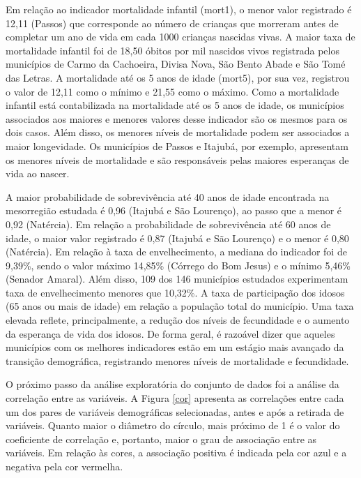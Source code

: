 \documentclass[10pt,twoside]{article}
\begin{document}
Em relação ao indicador mortalidade infantil (mort1), o menor valor registrado é 12,11 (Passos) que corresponde ao número de crianças que morreram antes de completar um ano de vida em cada 1000 crianças nascidas vivas. A maior taxa de mortalidade infantil foi de 18,50 óbitos por mil nascidos vivos registrada pelos municípios de Carmo da Cachoeira, Divisa Nova, São Bento Abade e São Tomé das Letras. A mortalidade até os 5 anos de idade (mort5), por sua vez, registrou o valor de 12,11 como o mínimo e 21,55 como o máximo. Como a mortalidade infantil está contabilizada na mortalidade até os 5 anos de idade, os municípios associados aos maiores e menores valores desse indicador são os mesmos para os dois casos. Além disso, os menores níveis de mortalidade podem ser associados a maior longevidade. Os municípios de Passos e Itajubá, por exemplo, apresentam os menores níveis de mortalidade e são responsáveis pelas maiores esperanças de vida ao nascer. 

A maior probabilidade de sobrevivência até 40 anos de idade encontrada na mesorregião estudada é 0,96 (Itajubá e São Lourenço), ao passo que a menor é 0,92 (Natércia). Em relação a probabilidade de sobrevivência até 60 anos de idade, o maior valor registrado é 0,87 (Itajubá e São Lourenço) e o menor é 0,80 (Natércia). Em relação à taxa de envelhecimento, a mediana do indicador foi de 9,39\%, sendo o valor máximo 14,85\% (Córrego do Bom Jesus) e o mínimo 5,46\% (Senador Amaral). Além disso, 109 dos 146 municípios estudados experimentam taxa de envelhecimento menores que 10,32\%. A taxa de participação dos idosos (65 anos ou mais de idade) em relação a população total do município. Uma taxa elevada reflete, principalmente, a redução dos níveis de fecundidade e o aumento da esperança de vida dos idosos. De forma geral, é razoável dizer que aqueles municípios com os melhores indicadores estão em um estágio mais avançado da transição demográfica, registrando menores níveis de mortalidade e fecundidade. 

O próximo passo da análise exploratória do conjunto de dados foi a análise da correlação entre as variáveis. A Figura \ref{cor} apresenta as correlações entre cada um dos pares de variáveis demográficas selecionadas, antes e após a retirada de variáveis. Quanto maior o diâmetro do círculo, mais próximo de 1 é o valor do coeficiente de correlação e, portanto, maior o grau de associação entre as variáveis. Em relação às cores, a associação positiva é indicada pela cor azul e a negativa pela cor vermelha. 
\end{document}

